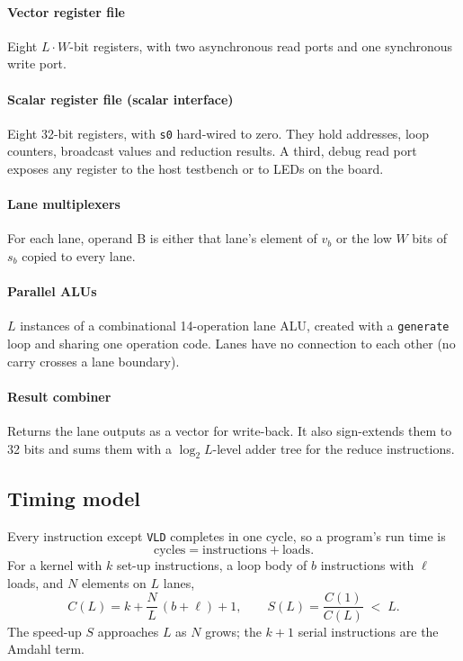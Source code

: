\documentclass[conference]{IEEEtran}
\begin{document}
\paragraph{Vector register file} Eight $L \cdot W$-bit registers, with two
asynchronous read ports and one synchronous write port.

\paragraph{Scalar register file (scalar interface)} Eight 32-bit registers, with
\texttt{s0} hard-wired to zero. They hold addresses, loop counters, broadcast values
and reduction results. A third, debug read port exposes any register to the host
testbench or to LEDs on the board.

\paragraph{Lane multiplexers} For each lane, operand B is either that lane's element
of $v_b$ or the low $W$ bits of $s_b$ copied to every lane.

\paragraph{Parallel ALUs} $L$ instances of a combinational 14-operation lane ALU,
created with a \texttt{generate} loop and sharing one operation code. Lanes have no
connection to each other (no carry crosses a lane boundary).

\paragraph{Result combiner} Returns the lane outputs as a vector for write-back.
It also sign-extends them to 32 bits and sums them with a $\log_2 L$-level adder tree
for the reduce instructions.

\subsection{Timing model}
Every instruction except \texttt{VLD} completes in one cycle, so a program's run time is
\begin{equation}
  \text{cycles} = \text{instructions} + \text{loads}.
\end{equation}
For a kernel with $k$ set-up instructions, a loop body of $b$ instructions with
$\ell$ loads, and $N$ elements on $L$ lanes,
\begin{equation}
  C(L) = k + \frac{N}{L}\,(b + \ell) + 1, \qquad
  S(L) = \frac{C(1)}{C(L)} \;<\; L .
\end{equation}
The speed-up $S$ approaches $L$ as $N$ grows; the $k + 1$ serial instructions are
the Amdahl term.
\end{document}

